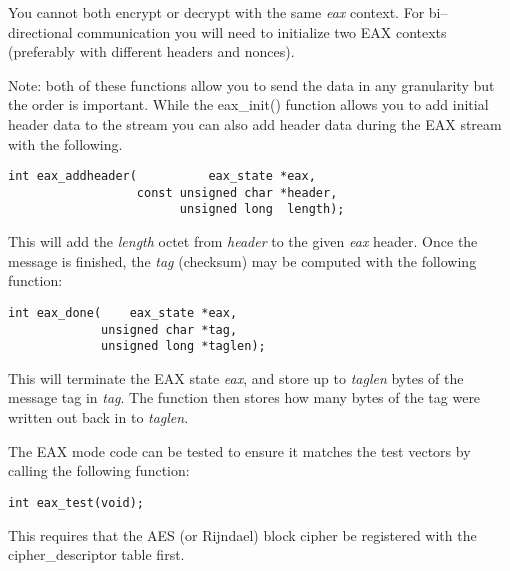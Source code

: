 \documentclass[synpaper]{book}
\begin{document}
You cannot both encrypt or decrypt with the same \textit{eax} context.  For bi--directional communication you will need to initialize
two EAX contexts (preferably with different headers and nonces).

Note: both of these functions allow you to send the data in any granularity but the order is important.  While
the eax\_init() function allows you to add initial header data to the stream you can also add header data during the
EAX stream with the following.

\begin{verbatim}
int eax_addheader(          eax_state *eax,
                  const unsigned char *header,
                        unsigned long  length);
\end{verbatim}
This will add the \textit{length} octet from \textit{header} to the given \textit{eax} header.  Once the message is finished, the
\textit{tag} (checksum) may be computed with the following function:

\begin{verbatim}
int eax_done(    eax_state *eax,
             unsigned char *tag,
             unsigned long *taglen);
\end{verbatim}
This will terminate the EAX state \textit{eax}, and store up to \textit{taglen} bytes of the message tag in \textit{tag}.  The function
then stores how many bytes of the tag were written out back in to \textit{taglen}.

The EAX mode code can be tested to ensure it matches the test vectors by calling the following function:
\begin{verbatim}
int eax_test(void);
\end{verbatim}
This requires that the AES (or Rijndael) block cipher be registered with the cipher\_descriptor table first.
\end{document}
